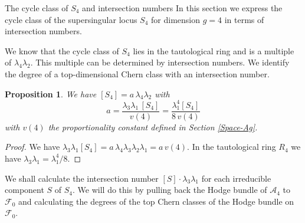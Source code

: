 \documentclass[11pt]{amsart}
\numberwithin{equation}{section}
\newtheorem{proposition}[theorem]{Proposition}
\theoremstyle{definition}
\theoremstyle{remark}
\begin{document}
\begin{section}{The cycle class of $S_4$ and intersection numbers}
In this section we express the cycle class of the supersingular
locus $S_4$ for dimension $g=4$ in terms of intersection numbers. 

We know that the cycle class of $S_4$ lies in the tautological ring
and is a multiple of $\lambda_4\lambda_2$. This multiple can be 
determined by intersection numbers. We identify the degree of
a top-dimensional Chern class with an intersection number.

\begin{proposition}\label{lambda4lambda2}
We have
$[S_4]= a \, \lambda_4\lambda_2$ with
$$
a= \frac{\lambda_3\lambda_1 \, [S_4]}{v(4)} = 
\frac{\lambda_1^4 [S_4]}{8\, v(4)}
$$ with
$v(4)$ the proportionality constant defined in Section \ref{Space-Ag}.
\end{proposition}
\begin{proof}
We have $\lambda_3\lambda_1[S_4]=
a \, \lambda_4\lambda_3\lambda_2\lambda_1=a \, v(4)$. 
In the tautological ring $R_4$ we have $\lambda_3\lambda_1=\lambda_1^4/8$.
\end{proof}
We shall calculate the intersection number $[S]\cdot \lambda_3\lambda_1$
for each irreducible component $S$ of $S_4$. We will do this
by pulling back the Hodge bundle of $\mathcal{A}_4$ to 
$\mathcal{F}_0$ and calculating the degrees of the top Chern
classes of the Hodge bundle on $\mathcal{F}_0$. 

\end{section}
\end{document}

